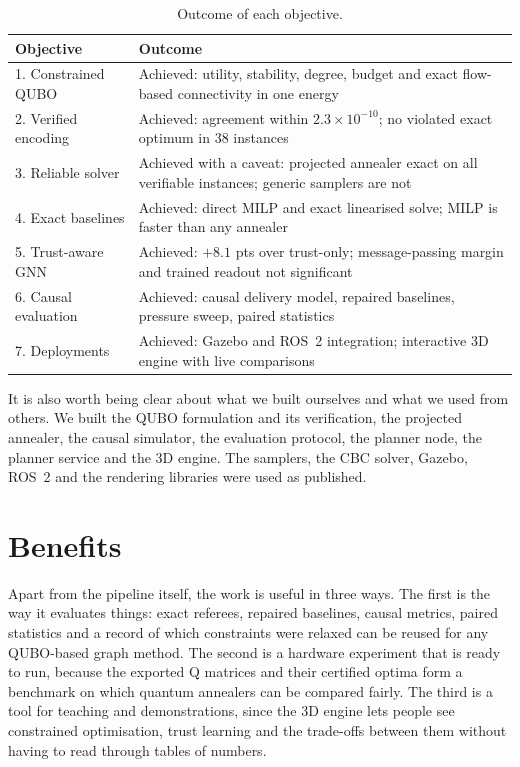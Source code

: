 \begin{table}[htbp]
\centering
\caption{Outcome of each objective.}
\label{tab:conc:objectives}
\small
\begin{tabularx}{\linewidth}{@{}l X@{}}
\toprule
Objective & Outcome \\
\midrule
1. Constrained QUBO & Achieved: utility, stability, degree, budget and exact flow-based connectivity in one energy \\
2. Verified encoding & Achieved: agreement within $2.3\times10^{-10}$; no violated exact optimum in 38 instances \\
3. Reliable solver & Achieved with a caveat: projected annealer exact on all verifiable instances; generic samplers are not \\
4. Exact baselines & Achieved: direct MILP and exact linearised solve; MILP is faster than any annealer \\
5. Trust-aware GNN & Achieved: $+8.1$ pts over trust-only; message-passing margin and trained readout not significant \\
6. Causal evaluation & Achieved: causal delivery model, repaired baselines, pressure sweep, paired statistics \\
7. Deployments & Achieved: Gazebo and ROS~2 integration; interactive 3D engine with live comparisons \\
\bottomrule
\end{tabularx}
\end{table}

It is also worth being clear about what we built ourselves and what we
used from others. We built the QUBO formulation and its verification, the
projected annealer, the causal simulator, the evaluation protocol, the
planner node, the planner service and the 3D engine. The samplers, the CBC
solver, Gazebo, ROS~2 and the rendering libraries were used as published.

\section{Benefits}

Apart from the pipeline itself, the work is useful in three ways. The first
is the way it evaluates things: exact referees, repaired baselines, causal
metrics, paired statistics and a record of which constraints were relaxed can
be reused for any QUBO-based graph method. The second is a hardware experiment
that is ready to run, because the exported Q matrices and their certified
optima form a benchmark on which quantum annealers can be compared fairly. The
third is a tool for teaching and demonstrations, since the 3D
engine lets people see constrained optimisation, trust learning and the
trade-offs between them without having to read through tables of numbers.

